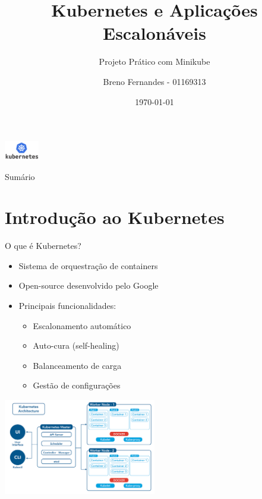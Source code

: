 \documentclass{beamer}
\title{Kubernetes e Aplicações Escalonáveis}
\subtitle{Projeto Prático com Minikube}
\author{Breno Fernandes - 01169313}
\institute{Uninassau}
\date{\today}
\begin{document}
\begin{frame}
    \centering
    \includegraphics[width=1.5cm]{Kubernetes-Logo.png}\\[0.5cm]
    \titlepage
\end{frame}


\begin{frame}{Sumário}
    \tableofcontents
\end{frame}

\section{Introdução ao Kubernetes}

\begin{frame}{O que é Kubernetes?}
    \begin{itemize}
        \item Sistema de orquestração de containers
        \item Open-source desenvolvido pelo Google
        \item Principais funcionalidades:
        \begin{itemize}
            \item Escalonamento automático
            \item Auto-cura (self-healing)
            \item Balanceamento de carga
            \item Gestão de configurações
        \end{itemize}
    \end{itemize}
    \centering
    \includegraphics[width=0.5\textwidth]{k8s-architecture.png}
\end{frame}
\end{document}
